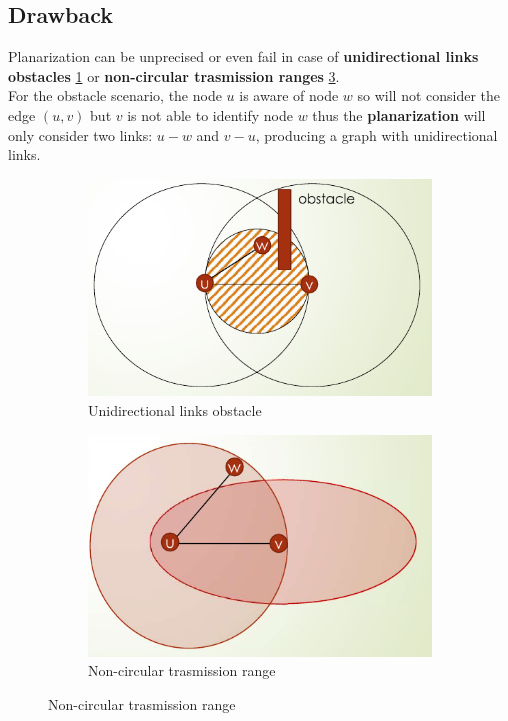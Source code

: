 \documentclass[10pt,a4paper]{report}
\theoremstyle{definition}
\begin{document}
\subsection{Drawback}\label{sec:drawback}
Planarization can be unprecised or even fail in case of \textbf{unidirectional links} \textbf{obstacles} \ref{fig:gpsr-unidir-prob} or \textbf{non-circular trasmission ranges} \ref{fig:gspr-non-circular-prob}.\\
For the obstacle scenario, the node $u$ is aware of node $w$ so will not consider the edge $(u,v)$ but  $v$ is not able to identify node $w$  thus the \textbf{planarization} will only consider two links: $u-w$ and $v-u$, producing a graph with unidirectional links.

\begin{figure}[h!]
	\centering
	\begin{subfigure}{.5\textwidth}
		\centering
		\includegraphics[width=.9\linewidth]{images/Pasted image 20230523164730.png}
		\caption{Unidirectional links obstacle}
		\label{fig:gpsr-unidir-prob}
	\end{subfigure}%
	\begin{subfigure}{.5\textwidth}
		\centering
		\includegraphics[width=.9\linewidth]{images/Pasted image 20230523164756.png}
		\caption{Non-circular trasmission range}
		\label{fig:gspr-non-circular-prob}
	\end{subfigure}
	
\end{figure}
\end{document}
